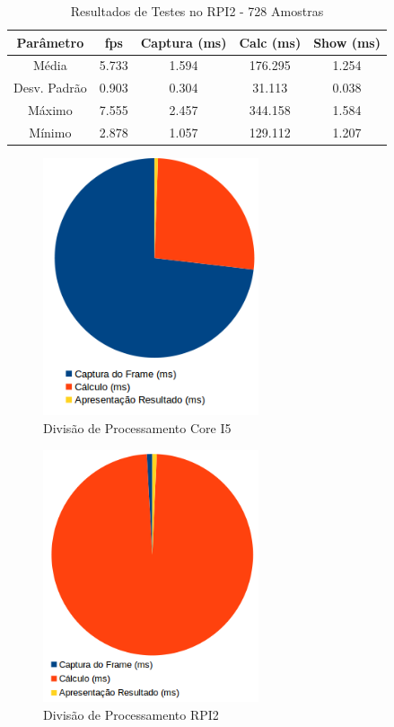 \documentclass[conference]{IEEEtran}
\begin{document}
\begin{table}[h]\centering
\renewcommand{\arraystretch}{1.3}
\caption{Resultados de Testes no RPI2 - 728 Amostras}
\label{tab:table_rpi}
\begin{tabular}{|c|c|c|c|c|}

\hline
\textbf{Parâmetro} & \textbf{fps} & \textbf{Captura (ms)} & \textbf{Calc (ms)} & \textbf{Show (ms)} \\\hline \hline
Média			& 5.733 & 1.594	&	176.295	&	1.254	\\ \hline
Desv. Padrão	& 0.903 & 0.304	&	31.113	&	0.038	\\ \hline
Máximo			& 7.555 & 2.457 &	344.158	&	1.584	\\ \hline
Mínimo			& 2.878 & 1.057 &	129.112	&	1.207	\\ \hline

\end{tabular}
\end{table}


\begin{figure}[!t]
\centering
\includegraphics[width=2.5in]{Grafico_processamento_I5}
\caption{Divisão de Processamento Core I5}
\label{fig:processamento_pc}
\end{figure}

\begin{figure}[!t]
\centering
\includegraphics[width=2.5in]{Grafico_processamento_rpi2_single_core}
\caption{Divisão de Processamento RPI2}
\label{fig:processamento_rpi}
\end{figure}
\end{document}
